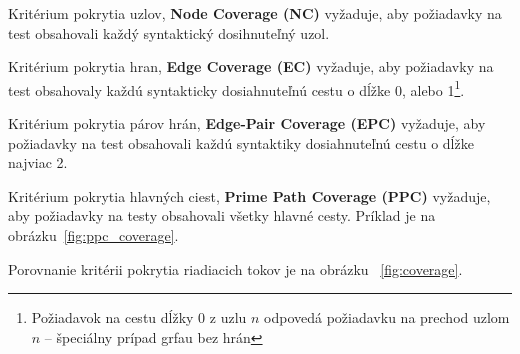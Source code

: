 \begin{description}
	\item Kritérium pokrytia uzlov, \textbf{Node Coverage (NC)} vyžaduje, aby požiadavky na test obsahovali každý syntaktický dosihnuteľný uzol.
	\item Kritérium pokrytia hran, \textbf{Edge Coverage (EC)} vyžaduje, aby požiadavky na test obsahovaly každú syntakticky dosiahnuteľnú cestu o dĺžke 0, alebo 1\footnote{Požiadavok na cestu dĺžky 0 z uzlu $n$ odpovedá požiadavku na prechod uzlom $n$ -- špeciálny prípad grfau bez hrán}.
	\item Kritérium pokrytia párov hrán, \textbf{Edge-Pair Coverage (EPC)} vyžaduje, aby požiadavky na test obsahovali každú syntaktiky dosiahnuteľnú cestu o dĺžke najviac 2.
	\item Kritérium pokrytia hlavných ciest, \textbf{Prime Path Coverage (PPC)} vyžaduje, aby požiadavky na testy obsahovali všetky hlavné cesty. Príklad je na obrázku~\ref{fig:ppc_coverage}.
\end{description}
Porovnanie kritérii pokrytia riadiacich tokov je na obrázku ~\ref{fig:coverage}.

